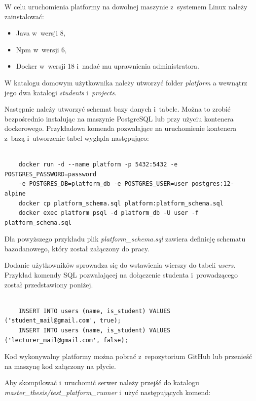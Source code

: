 W celu uruchomienia platformy na dowolnej maszynie z~systemem Linux należy zainstalować:
\begin{itemize}
    \item Java w~wersji 8,
    \item Npm w~wersji 6,
    \item Docker w~wersji 18 i~nadać mu uprawnienia administratora.
\end{itemize}

W katalogu domowym użytkownika należy utworzyć folder \textit{platform} a wewnątrz jego dwa katalogi \textit{students} i~\textit{projects}.

Następnie należy utworzyć schemat bazy danych i~tabele.
Można to zrobić bezpośrednio instalując na maszynie PostgreSQL lub przy użyciu kontenera dockerowego.
Przykładowa komenda pozwalające na uruchomienie kontenera z~bazą i~utworzenie tabel wygląda następująco:

{\selectfont
\tiny
\begin{lstlisting}

    docker run -d --name platform -p 5432:5432 -e POSTGRES_PASSWORD=password
    -e POSTGRES_DB=platform_db -e POSTGRES_USER=user postgres:12-alpine
    docker cp platform_schema.sql platform:platform_schema.sql
    docker exec platform psql -d platform_db -U user -f platform_schema.sql

\end{lstlisting}
}

Dla powyższego przykładu plik \textit{platform\_schema.sql} zawiera definicję schematu bazodanowego, który został załączony do pracy.

Dodanie użytkowników sprowadza się do wstawienia wierszy do tabeli \textit{users}.
Przykład komendy SQL pozwalającej na dołączenie studenta i~prowadzącego został przedstawiony poniżej.

{\selectfont
\tiny
\begin{lstlisting}

    INSERT INTO users (name, is_student) VALUES ('student_mail@gmail.com', true);
    INSERT INTO users (name, is_student) VALUES ('lecturer_mail@gmail.com', false);

\end{lstlisting}
}

Kod wykonywalny platformy można pobrać z~repozytorium GitHub lub przenieść na maszynę kod załączony na płycie.

Aby skompilować i~uruchomić serwer należy przejść do katalogu \newline \textit{master\_thesis/test\_platform\_runner} i~użyć następujących komend:


